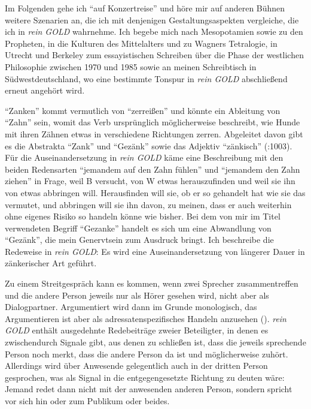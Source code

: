 \documentclass[fontsize=12pt]{scrartcl}
\begin{document}
Im Folgenden gehe ich "`auf Konzertreise"' und h\"ore mir auf anderen B\"uhnen weitere Szenarien an, die ich mit denjenigen Gestaltungsaspekten vergleiche, die ich in \textit{rein GOLD} wahrnehme. Ich begebe mich nach Mesopotamien sowie zu den Propheten\textsuperscript{\tiny *}, in die Kulturen des Mittelalters und zu Wagners Tetralogie, in Utrecht und Berkeley zum essayistischen Schrei\-ben \"uber die Phase der westlichen Philosophie zwischen 1970 und 1985 sowie an meinen Schreibtisch in S\"udwestdeutschland, wo eine be\-stimmte Tonspur in \textit{rein GOLD} abschlie{\ss}end erneut angeh\"ort wird.

"`Zanken"' kommt vermutlich von "`zerrei{\ss}en"' und k\"onnte ein Ableitung von "`Zahn"' sein, womit das Verb urspr\"ung\-lich m\"oglicherweise beschreibt, wie Hunde mit ihren Z\"ahnen etwas in verschiedene Richtungen zerren. Abgeleitet davon gibt es die Abstrakta "`Zank"' und "`Gez\"ank"' sowie das Adjektiv "`z\"ankisch"' (\cite{Seebold2002}:1003). F\"ur die Auseinandersetzung in \textit{rein GOLD} k\"ame eine Beschreibung mit den beiden Re\-dens\-ar\-ten "`jemandem auf den Zahn f\"uhlen"' und "`jemandem den Zahn ziehen"' in Frage, weil B versucht, von W etwas he\-rauszufinden und weil sie ihn von etwas abbringen will. He\-rausfinden will sie, ob er so gehandelt hat wie sie das vermutet, und abbringen will sie ihn davon, zu meinen, dass er auch weiterhin ohne eigenes Risiko so handeln k\"onne wie bis\-her. Bei dem von mir im Titel verwendeten Begriff "`Gezanke"' handelt es sich um eine Abwandlung von "`Gez\"ank"', die mein Genervtsein zum Ausdruck bringt. Ich beschreibe die Redeweise in \textit{rein GOLD}: Es wird eine Auseinandersetzung von l\"angerer Dauer in z\"ankerischer Art gef\"uhrt. 

Zu einem Streitgespr\"ach kann es kommen, wenn zwei Sprecher\textsuperscript{\tiny *} zusammentreffen und die andere Person jeweils nur als H\"orer\textsuperscript{\tiny *} gesehen wird, nicht aber als Dialogpartner\textsuperscript{\tiny *}. Argumentiert wird dann im Grunde monologisch, das Argumentieren ist aber als adressatenspezifisches Handeln anzusehen (\cite{Rudolf1998}). \textit{rein GOLD} enth\"alt ausgedehnte Redebeitr\"age zweier Beteiligter, in denen es zwischendurch Signale gibt, aus denen zu schlie{\ss}en ist, dass die jeweils sprechende Person noch merkt, dass die andere Person da ist und m\"oglicherweise zuh\"ort. Al\-ler\-dings wird \"uber Anwesende gelegentlich auch in der dritten Person gesprochen, was als Signal in die entgegengesetzte Richtung zu deuten w\"are: Jemand redet dann nicht mit der anwesenden anderen Person, sondern spricht vor sich hin oder zum Publikum oder beides.
\end{document}
